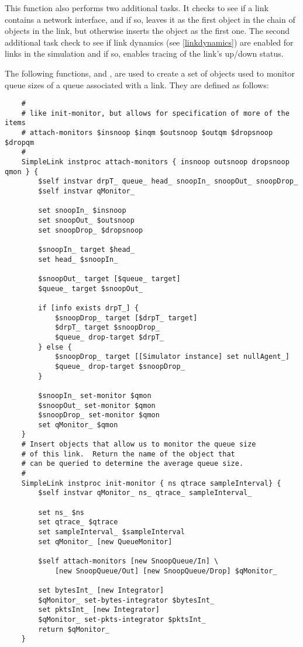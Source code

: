 This function also performs two additional tasks.
It checks to see if a link contains a network interface,
and if so, leaves it as the first object in the chain of objects
in the link, but otherwise inserts the  object as
the first one.
The second additional task check to see if link dynamics
(see \ref{linkdynamics}) are enabled for links in the simulation
and if so, enables tracing of the link's up/down status.



The following functions,  and
, are used to create a set of
objects used to monitor queue sizes of a queue associated
with a link.
They are defined as follows:
\begin{small}
\begin{verbatim}
	#
	# like init-monitor, but allows for specification of more of the items
	# attach-monitors $insnoop $inqm $outsnoop $outqm $dropsnoop $dropqm
	#
	SimpleLink instproc attach-monitors { insnoop outsnoop dropsnoop qmon } {
		$self instvar drpT_ queue_ head_ snoopIn_ snoopOut_ snoopDrop_
		$self instvar qMonitor_

		set snoopIn_ $insnoop
		set snoopOut_ $outsnoop
		set snoopDrop_ $dropsnoop

		$snoopIn_ target $head_
		set head_ $snoopIn_

		$snoopOut_ target [$queue_ target]
		$queue_ target $snoopOut_

		if [info exists drpT_] {
			$snoopDrop_ target [$drpT_ target]
			$drpT_ target $snoopDrop_
			$queue_ drop-target $drpT_
		} else {
			$snoopDrop_ target [[Simulator instance] set nullAgent_]
			$queue_ drop-target $snoopDrop_
		}

		$snoopIn_ set-monitor $qmon
		$snoopOut_ set-monitor $qmon
		$snoopDrop_ set-monitor $qmon
		set qMonitor_ $qmon
	}
	# Insert objects that allow us to monitor the queue size
	# of this link.  Return the name of the object that
	# can be queried to determine the average queue size.
	#
	SimpleLink instproc init-monitor { ns qtrace sampleInterval} {
		$self instvar qMonitor_ ns_ qtrace_ sampleInterval_

		set ns_ $ns
		set qtrace_ $qtrace
		set sampleInterval_ $sampleInterval
		set qMonitor_ [new QueueMonitor]

		$self attach-monitors [new SnoopQueue/In] \
			[new SnoopQueue/Out] [new SnoopQueue/Drop] $qMonitor_

		set bytesInt_ [new Integrator]
		$qMonitor_ set-bytes-integrator $bytesInt_
		set pktsInt_ [new Integrator]
		$qMonitor_ set-pkts-integrator $pktsInt_
		return $qMonitor_
	}
\end{verbatim}
\end{small}

